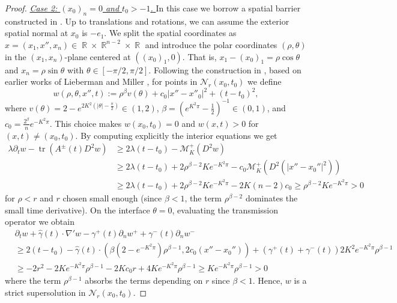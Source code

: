 \documentclass[12pt]{article}
\numberwithin{Theorem}{section}
\theoremstyle{definition}
\theoremstyle{remark}
\numberwithin{equation}{section}
\DeclareMathOperator{\R}{\mathbb{R}}
\DeclareMathOperator*{\tr}{tr}
\newcommand*{\Mp}{\mathcal{M}_{K}^{+}}
\newcommand{\p}{\partial}
\begin{document}
\begin{proof}
    \underline{\textit{Case 2: $(x_0)_n = 0$ and $t_0 >-1$. }} 
    In this case we borrow a spatial barrier constructed in \cite{erneta2026existence}.
     Up to translations and rotations, we can assume the exterior spatial normal at $x_0$ is $-e_1$.
    We split the spatial coordinates as $x = (x_1, x'', x_n) \in \R \times \R^{n-2} \times \R$ and introduce the polar coordinates $(\rho, \theta)$ in the $(x_1, x_n)$-plane centered  at $((x_0)_1, 0)$. That is, $x_1 - (x_0)_1 = \rho \cos \theta$ and $x_n = \rho \sin \theta$  with $\theta \in [-\pi/2, \pi/2]$.
    Following the construction in \cite[Lemma 5.2]{erneta2026existence}, based on earlier works of Lieberman \cite{lieberman1986mixed} and Miller \cite{Miller}, for points in $\mathcal{N}_r(x_0,t_0)$ we define 
    $$ w(\rho,\theta,x'',t) := \rho^\beta v(\theta) + c_0|x'' - x''_0|^2 + (t - t_0)^2, $$
    where $v(\theta) = 2 - e^{2K^2(|\theta| - \frac{\pi}{2})} \in (1,2)$, $\beta=(e^{K^2 \pi}-\frac{1}{2})^{-1}\in (0,1)$, and $c_0=\frac{2^\beta}{n}e^{-K^2\pi}$. This choice makes $w(x_0,t_0)=0$ and $w(x,t)>0$ for $(x,t) \neq (x_0,t_0)$.
 By computing explicitly the interior equations we get
 \begin{align*}
      \lambda \p_t w - \tr(A^\pm(t)D^2 w ) &\geq  2\lambda(t-t_0) - \Mp(D^2 w ) \\ &\geq 2\lambda(t-t_0) + 2 \rho^{\beta-2}Ke^{-K^2\pi} -c_0 \Mp(D^2 (|x''-x_0''|^2))  \\ 
      & \geq 2\lambda(t-t_0) + 2 \rho^{\beta-2}Ke^{-K^2\pi} - 2K(n-2)c_0 \geq \rho^{\beta-2}Ke^{-K^2\pi} > 0
      \end{align*}
      for $\rho <r$ and $r$ chosen small enough (since $\beta < 1$, the term $\rho^{\beta-2}$ dominates the small time derivative). On the interface $\theta = 0$, evaluating the transmission operator we obtain 
      \begin{align*}
          &\partial_t w + \hat{\gamma}(t) \cdot \nabla' w- \gamma^+(t) \partial_n w^+ + \gamma^-(t) \partial_n w^-  \\
          & \geq  2(t-t_0) - \hat\gamma(t) \cdot \left( \beta(2-e^{-K^2\pi})\rho^{\beta-1},2c_0(x''-x_0'')\right) + (\gamma^+(t) + \gamma^-(t)) 2K^2e^{-K^2\pi} \rho^{\beta-1}\\
          &\geq -2r^2 -2Ke^{-K^2\pi} \rho^{\beta-1} - 2 K c_0 r + 4K e^{-K^2\pi} \rho^{\beta-1} \geq Ke^{-K^2\pi} \rho^{\beta-1} >0
      \end{align*}
  where the term $\rho^{\beta-1}$ absorbs the terms depending on $r$ since $\beta <1$. Hence, $w$ is a strict supersolution in $\mathcal{N}_r(x_0,t_0)$.
  

\end{proof}
\end{document}
